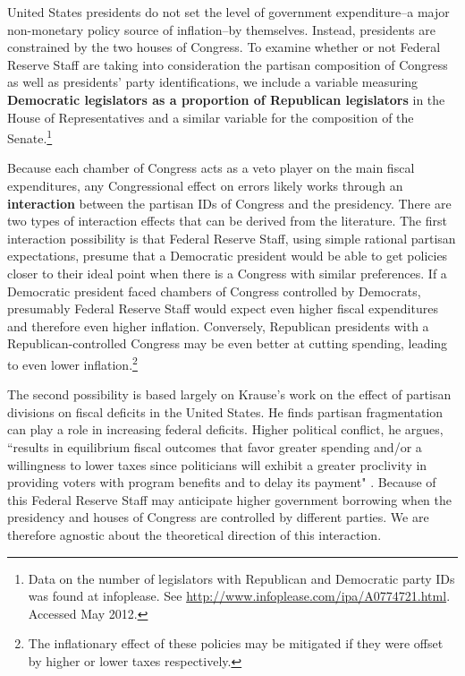 \documentclass[a4paper]{article}
\begin{document}
United States presidents do not set the level of government expenditure--a major non-monetary policy source of inflation--by themselves. Instead, presidents are constrained by the two houses of Congress. To examine whether or not Federal Reserve Staff are taking into consideration the partisan composition of Congress as well as presidents' party identifications, we include a variable measuring {\bf{Democratic legislators as a proportion of Republican legislators}} in the House of Representatives and a similar variable for the composition of the Senate.\footnote{Data on the number of legislators with Republican and Democratic party IDs was found at infoplease. See {\url{http://www.infoplease.com/ipa/A0774721.html}}. Accessed May 2012.} 

Because each chamber of Congress acts as a veto player on the main fiscal expenditures, any Congressional effect on errors likely works through an \textbf{interaction} between the partisan IDs of Congress and the presidency. There are two types of interaction effects that can be derived from the literature. The first interaction possibility is that Federal Reserve Staff, using simple rational partisan expectations, presume that a Democratic president would be able to get policies closer to their ideal point when there is a Congress with similar preferences. If a Democratic president faced chambers of Congress controlled by Democrats, presumably Federal Reserve Staff would expect even higher fiscal expenditures and therefore even higher inflation. Conversely, Republican presidents with a Republican-controlled Congress may be even better at cutting spending, leading to even lower inflation.\footnote{The inflationary effect of these policies may be mitigated if they were offset by higher or lower taxes respectively.}

The second possibility is based largely on Krause's \citeyearpar{Krause2000} work on the effect of partisan divisions on fiscal deficits in the United States. He finds partisan fragmentation can play a role in increasing federal deficits. Higher political conflict, he argues, ``results in equilibrium fiscal outcomes that favor greater spending and/or a willingness to lower taxes since politicians will exhibit a greater proclivity in providing voters with program benefits and to delay its payment" \citep[][542]{Krause2000}. Because of this Federal Reserve Staff may anticipate higher government borrowing when the presidency and houses of Congress are controlled by different parties. We are therefore agnostic about the theoretical direction of this interaction.
\end{document}
